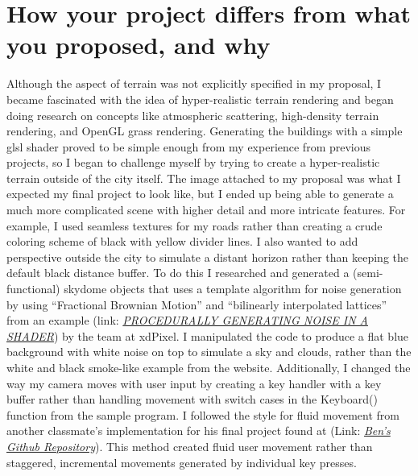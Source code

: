 \documentclass[journal,10pt,onecolumn,compsoc]{IEEEtran}
\begin{document}
\section{How your project differs from what you proposed, and why}
\noindent Although the aspect of terrain was not explicitly specified in my proposal, I became fascinated with the idea of hyper-realistic terrain rendering and began doing research on concepts like atmospheric scattering, high-density terrain rendering, and OpenGL grass rendering. Generating the buildings with a simple glsl shader proved to be simple enough from my experience from previous projects, so I began to challenge myself by trying to create a hyper-realistic terrain outside of the city itself. The image attached to my proposal was what I expected my final project to look like, but I ended up being able to generate a much more complicated scene with higher detail and more intricate features. For example, I used seamless textures for my roads rather than creating a crude coloring scheme of black with yellow divider lines. 
\noindent I also wanted to add perspective outside the city to simulate a distant horizon rather than keeping the default black distance buffer. To do this I researched and generated a (semi-functional) skydome objects that uses a template algorithm for noise generation by using ``Fractional Brownian Motion'' and ``bilinearly interpolated lattices'' from an example (link: \href{http://xdpixel.com/procedurally-generating-noise-in-a-shader/}{\textit{PROCEDURALLY GENERATING NOISE IN A SHADER}}) by the team at xdPixel. I manipulated the code to produce a flat blue background with white noise on top to simulate a sky and clouds, rather than the white and black smoke-like example from the website.
\noindent Additionally, I changed the way my camera moves with user input by creating a key handler with a key buffer rather than handling movement with switch cases in the Keyboard() function from the sample program. I followed the style for fluid movement from another classmate's implementation for his final project found at (Link: \href{https://github.com/BeNsAeI/Tank-2017-Linux}{\textit{Ben's Github Repository}}). This method created fluid user movement rather than staggered, incremental movements generated by individual key presses.
\end{document}
